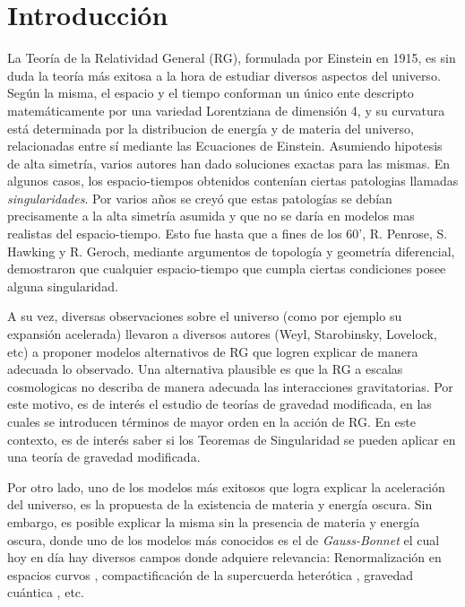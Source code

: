 ﻿\chapter{Introducción}





La Teoría de la Relatividad General (RG), formulada por Einstein en 1915, es sin duda la teoría más exitosa a la hora de estudiar diversos aspectos del universo. Según la misma, el espacio y el tiempo conforman un único ente descripto matemáticamente por una variedad Lorentziana de dimensión 4, y su curvatura está determinada por la distribucion de energía y de materia del universo, relacionadas entre sí mediante las Ecuaciones de Einstein. Asumiendo hipotesis de alta simetría, varios autores han dado soluciones exactas para las mismas. En algunos casos, los espacio-tiempos obtenidos contenían ciertas patologias llamadas \textit{singularidades}. Por varios años se creyó que estas patologías se debían precisamente a la alta simetría asumida y que no se daría en modelos mas realistas del espacio-tiempo. Esto fue hasta que a fines de los 60', R. Penrose, S. Hawking y R. Geroch, mediante argumentos de topología y geometría diferencial, demostraron que cualquier espacio-tiempo que cumpla ciertas condiciones posee alguna singularidad.


A su vez, diversas observaciones sobre el universo (como por ejemplo su expansión acelerada) llevaron a diversos autores (Weyl, Starobinsky, Lovelock, etc) a proponer modelos alternativos de RG que logren explicar de manera adecuada lo observado. Una alternativa plausible es que la RG a escalas cosmologicas no describa de manera adecuada las interacciones gravitatorias. Por este motivo, es de interés el estudio de teorías de gravedad modificada, en las cuales se introducen términos de mayor orden en la acción de RG. En este contexto, es de interés saber si los Teoremas de Singularidad se pueden aplicar en una teoría de gravedad modificada.


Por otro lado, uno de los modelos más exitosos que logra explicar la aceleración del universo, es la propuesta de la existencia de materia y energía oscura. Sin embargo, es posible explicar la misma sin la presencia de materia y energía oscura, donde uno de los modelos más conocidos es el de \textit{Gauss-Bonnet} el cual hoy en día hay diversos campos donde adquiere relevancia: Renormalización en espacios curvos \citep{1982qfcs.book..340B,2017arXiv170601572F}, compactificación de la supercuerda heterótica \citep{1985NuPhB.262..593C,1982AnPhy.143..413F,1985PhRvD..32.2102S,1985PhRvL..55.1846S,1987NuPhB.291...41G}, gravedad cuántica \citep{2017arXiv170609315H,2017arXiv170700169K,2017arXiv170503161F}, etc.



